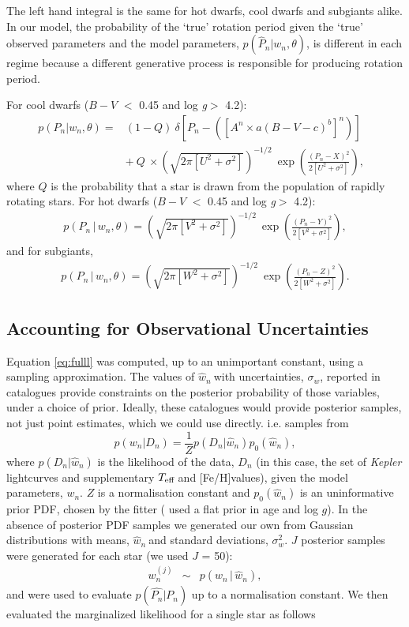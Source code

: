 \documentclass[10pt,preprint]{aastex}
\newcommand{\logg}{log \emph{g}}
\newcommand{\teff}{$T_{\rm{eff}}$}
\newcommand{\wh}{$\hat{w}_n$}
\newcommand{\feh}{[Fe/H]}
\begin{document}
The left hand integral is the same for hot dwarfs, cool dwarfs and subgiants alike.
In our model, the probability of the `true' rotation period given the `true' observed parameters and the model parameters, $p(\hat{P}_n|w_n, \theta)$, is different in each regime because a different generative process is responsible for producing rotation period.

For cool dwarfs ($B-V$ $<$ 0.45 and \logg $>$ 4.2):
\begin{eqnarray}
p(P_n|w_n,\theta) =
	& (1-Q)~\delta \left [P_n - \left(\left[A^n \times a(B-V - c)^b\right]^n\right) \right] \quad \\
	& +~Q~\times \left(\sqrt{2\pi[U^2+\sigma^2]}\right)^{-1/2}~\exp\left({\frac{(P_n-X)^2}{2[U^2+\sigma^2]}}\right),
\end{eqnarray}
where $Q$ is the probability that a star is drawn from the population of rapidly rotating stars.
For hot dwarfs ($B-V$ $<$ 0.45 and \logg $>$ 4.2):
\begin{eqnarray}
p(P_n\,|\,w_n,\theta) = \left(\sqrt{2\pi[V^2+\sigma^2]}\right)^{-1/2}~\exp\left({\frac{(P_n-Y)^2}{2[V^2+\sigma^2]}}\right),
\end{eqnarray}
and for subgiants,
\begin{eqnarray}
p(P_n\,|\,w_n,\theta) = \left(\sqrt{2\pi[W^2+\sigma^2]}\right)^{-1/2}~\exp\left({\frac{(P_n-Z)^2}{2[W^2+\sigma^2]}}\right).
\end{eqnarray}

\subsection{Accounting for Observational Uncertainties}

Equation \ref{eq:fulll} was computed, up to an unimportant constant, using a sampling approximation.
The values of \wh$~$with uncertainties, $\sigma_w$, reported in catalogues provide constraints on the posterior probability of those variables, under a choice of prior.
Ideally, these catalogues would provide posterior samples, not just point estimates, which we could use directly.
i.e. samples from
\begin{equation}
p(w_n|D_n) = \frac{1}{Z}p(D_n|\hat{w}_n)p_0(\hat{w}_n),
\end{equation}
where $p(D_n|\hat{w}_n)$ is the likelihood of the data, $D_n$ (in this case, the set of {\it Kepler} lightcurves and supplementary \teff$~$and \feh values), given the model parameters, $w_n$.
$Z$ is a normalisation constant and $p_0(\hat{w}_n)$ is an uninformative prior PDF, chosen by the fitter (\citet{Chaplin2014} used a flat prior in age and log $g$).
In the absence of posterior PDF samples we generated our own from Gaussian distributions with means, \wh$~$and standard deviations, $\sigma_w^2$.
$J$ posterior samples were generated for each star (we used $J$ = 50):
\begin{eqnarray}
w_n^{(j)} &\sim& p(w_n\,|\,\hat{w}_n),
\end{eqnarray}
and were used to evaluate $p(\hat{P_n}|P_n)$ up to a normalisation constant.
We then evaluated the marginalized likelihood for a single star as follows
\end{document}
